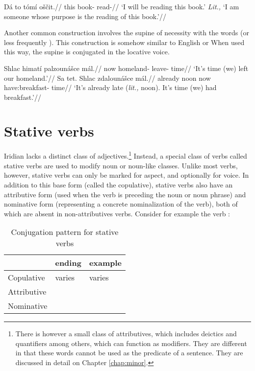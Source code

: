 \pex
\begingl
\gla Dá to t\'om\'i oščit.//
\glb \First{}\Sg{} this book-\Gen{} read-//
\glft `I will be reading this book.' \emph{Lit.,} `I am someone whose purpose is the reading of this book.'//
\endgl
\xe

Another common construction involves the supine of necessity with the words   (or less frequently ). This construction is somehow similar to English  or  When used this way, the supine is conjugated in the locative voice.

\pex
\begingl
\gla Shlac himatí palzounášce mál.//
\glb now homeland-\Gen{} leave- time//
\glft `It's time (we) left our homeland.'//
\endgl
\xe
\pex
\begingl
\gla Sa tet. Shlac zdalounášce mál.//
\glb already noon now have:breakfast- time//
\glft `It's already late (\emph{lit.,} noon). It's time (we) had breakfast.'//
\endgl
\xe

\section{Stative verbs}\label{sec:statives}

Iridian lacks a distinct class of adjectives.\footnote{There is however a small class of attributives, which includes deictics and quantifiers among others, which can function as modifiers. They are different in that these words cannot be used as the predicate of a sentence. They are discussed in detail on Chapter \ref{chap:minor}.} Instead, a special class of verbs called {\sc stative verbs} are used to modify noun or noun-like classes. Unlike most verbs, however, stative verbs can only be marked for aspect, and optionally for voice. In addition to this base form (called the {\sc copulative}), stative verbs also have an {\sc attributive} form (used when the verb is preceding the noun or noun phrase) and {\sc nominative} form (representing a concrete nominalization of the verb), both of which are absent in non-attributives verbs. Consider for example the verb  :

\begin{table}[h!]
	\small
	\caption{Conjugation pattern for stative verbs}
	\medskip
	\begin{tabu} to 0.7\textwidth{YY[0.8]Y}
		\toprule
		&{\sc ending}&{\sc example}\\
		\midrule
		Copulative & varies & varies\\
		Attributive &  & \\
		Nominative & 	& \\
		\bottomrule
	\end{tabu}
\end{table}

